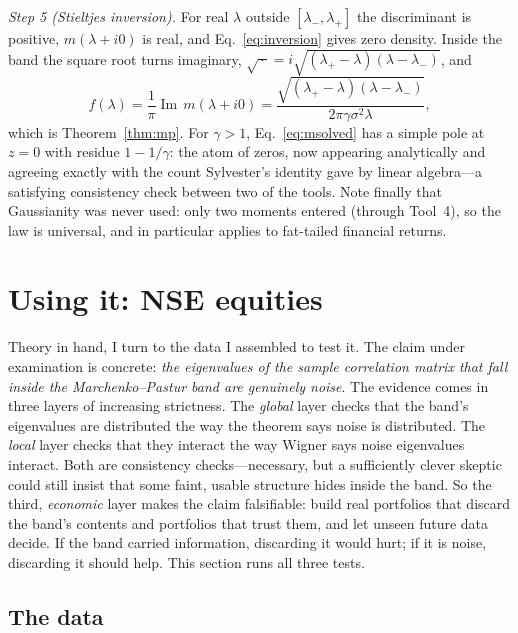 \documentclass[11pt]{article}
\newcommand{\lplus}{\lambda_{+}}
\newcommand{\lminus}{\lambda_{-}}
\newcommand{\Imag}{\operatorname{Im}}
\begin{document}
\emph{Step 5 (Stieltjes inversion).} For real $\lambda$ outside
$[\lminus,\lplus]$ the discriminant is positive, $m(\lambda+i0)$ is real,
and Eq.~\eqref{eq:inversion} gives zero density. Inside the band the
square root turns imaginary,
$\sqrt{\,\cdot\,}=i\sqrt{(\lplus-\lambda)(\lambda-\lminus)}$, and
\begin{equation}
f(\lambda)=\frac1\pi\Imag\,m(\lambda+i0)
=\frac{\sqrt{(\lplus-\lambda)(\lambda-\lminus)}}
{2\pi\gamma\sigma^{2}\lambda},
\end{equation}
which is Theorem~\ref{thm:mp}. For $\gamma>1$, Eq.~\eqref{eq:msolved} has
a simple pole at $z=0$ with residue $1-1/\gamma$: the atom of zeros,
now appearing analytically and agreeing exactly with the count Sylvester's
identity gave by linear algebra---a satisfying consistency check between
two of the tools. Note finally that Gaussianity was never used: only two
moments entered (through Tool~4), so the law is universal, and in
particular applies to fat-tailed financial returns.

\section{Using it: NSE equities}
\label{sec:application}

Theory in hand, I turn to the data I assembled to test it. The claim under
examination is concrete: \emph{the eigenvalues of the sample correlation
matrix that fall inside the Marchenko--Pastur band are genuinely noise}.
The evidence comes in three layers of increasing strictness. The
\emph{global} layer checks that the band's eigenvalues are distributed the
way the theorem says noise is distributed. The \emph{local} layer checks
that they interact the way Wigner says noise eigenvalues interact. Both
are consistency checks---necessary, but a sufficiently clever skeptic
could still insist that some faint, usable structure hides inside the
band. So the third, \emph{economic} layer makes the claim falsifiable:
build real portfolios that discard the band's contents and portfolios
that trust them, and let unseen future data decide. If the band carried
information, discarding it would hurt; if it is noise, discarding it
should help. This section runs all three tests.

\subsection{The data}
\end{document}
